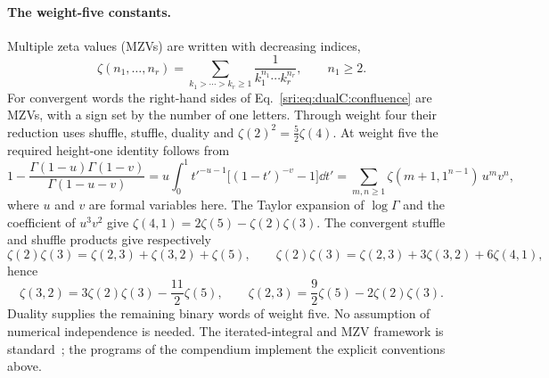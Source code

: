 \paragraph{The weight-five constants.} Multiple zeta values (MZVs) are written with decreasing indices,
\begin{equation}
 \zeta(n_1,\ldots,n_r)=\sum_{k_1>\cdots>k_r\ge1}\frac1{k_1^{n_1}\cdots k_r^{n_r}},\qquad n_1\ge2.
\end{equation}
For convergent words the right-hand sides of Eq.~\eqref{sri:eq:dualC:confluence} are MZVs, with a sign set by the number of
one letters. Through weight four their reduction uses shuffle, stuffle, duality and $\zeta(2)^2=\frac52\zeta(4)$. At
weight five the required height-one identity follows from
\begin{equation}
 1-\frac{\Gamma(1-u)\Gamma(1-v)}{\Gamma(1-u-v)}
 =u\int_0^1t'^{-u-1}\bigl[(1-t')^{-v}-1\bigr]\dd t'
 =\sum_{m,n\ge1}\zeta(m+1,1^{n-1})\,u^mv^n,
 \label{sri:eq:dualC:heightone}
\end{equation}
where $u$ and $v$ are formal variables here. The Taylor expansion of $\log\Gamma$ and the coefficient of $u^3v^2$
give $\zeta(4,1)=2\zeta(5)-\zeta(2)\zeta(3)$. The convergent stuffle and shuffle products give respectively
\begin{equation}
 \zeta(2)\zeta(3)=\zeta(2,3)+\zeta(3,2)+\zeta(5),\qquad
 \zeta(2)\zeta(3)=\zeta(2,3)+3\zeta(3,2)+6\zeta(4,1),
\end{equation}
hence
\begin{equation}
 \zeta(3,2)=3\zeta(2)\zeta(3)-\frac{11}{2}\zeta(5),\qquad
 \zeta(2,3)=\frac92\zeta(5)-2\zeta(2)\zeta(3).
\end{equation}
Duality supplies the remaining binary words of weight five. No assumption of numerical independence is needed. The
iterated-integral and MZV framework is standard~\cite{sri:Brown:2011uzk,sri:Brown:2013depth}; the programs of the compendium
implement the explicit conventions above.


